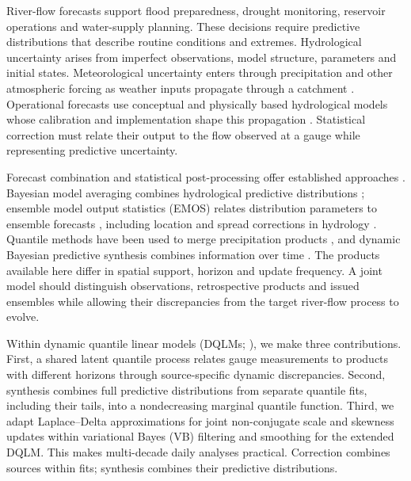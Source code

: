 \documentclass[APA,STIX1COL]{WileyNJD-v2}
\begin{document}
River-flow forecasts support flood preparedness, drought monitoring, reservoir operations and water-supply planning. These decisions require predictive distributions that describe routine conditions and extremes. Hydrological uncertainty arises from imperfect observations, model structure, parameters and initial states. Meteorological uncertainty enters through precipitation and other atmospheric forcing as weather inputs propagate through a catchment \citep{thiboult2016accounting,tarek2021daily}. Operational forecasts use conceptual and physically based hydrological models whose calibration and implementation shape this propagation \citep{demargne2013science}. Statistical correction must relate their output to the flow observed at a gauge while representing predictive uncertainty.

Forecast combination and statistical post-processing offer established approaches \citep{siegert2019forecast,vannitsem,wang2022forecastcombinations50yearreview}. Bayesian model averaging combines hydrological predictive distributions \citep{duan2006bma}; ensemble model output statistics (EMOS) relates distribution parameters to ensemble forecasts \citep{gneiting2005emos}, including location and spread corrections in hydrology \citep{hemri2015multivariate}. Quantile methods have been used to merge precipitation products \citep{yumnam2022quantile}, and dynamic Bayesian predictive synthesis combines information over time \citep{mcalinn2019dynamic}. The products available here differ in spatial support, horizon and update frequency. A joint model should distinguish observations, retrospective products and issued ensembles while allowing their discrepancies from the target river-flow process to evolve.

Within dynamic quantile linear models (DQLMs; \citealp{gourieroux2008dqlm,goncalves,barata2021_flex_quantile}), we make three contributions. First, a shared latent quantile process relates gauge measurements to products with different horizons through source-specific dynamic discrepancies. Second, synthesis combines full predictive distributions from separate quantile fits, including their tails, into a nondecreasing marginal quantile function. Third, we adapt Laplace--Delta approximations \citep{wang2013nonconjugatevb} for joint non-conjugate scale and skewness updates within variational Bayes (VB) filtering and smoothing for the extended DQLM. This makes multi-decade daily analyses practical. Correction combines sources within fits; synthesis combines their predictive distributions.
\end{document}
